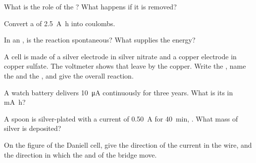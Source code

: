 \begin{exercise}[$\star$]\label{exo:g12:cells-and-electrolysis:3}
What is the role of the ? What happens if it is removed?
\end{exercise}

\begin{exercise}[$\star$]\label{exo:g12:cells-and-electrolysis:4}
Convert a  of \qty{2.5}{A.h} into coulombs.
\end{exercise}

\begin{exercise}[$\star$]\label{exo:g12:cells-and-electrolysis:5}
In an , is the reaction spontaneous? What supplies the
energy?
\end{exercise}

\begin{exercise}[$\star\star$]\label{exo:g12:cells-and-electrolysis:6}
A cell is made of a silver electrode in silver nitrate and a copper
electrode in copper sulfate. The voltmeter shows that  leave
by the copper. Write the , name the  and the ,
and give the overall reaction.
\end{exercise}

\begin{exercise}[$\star\star$]\label{exo:g12:cells-and-electrolysis:7}
A watch battery delivers \qty{10}{\micro A} continuously for three years.
What is its  in \si{mA.h}?
\end{exercise}

\begin{exercise}[$\star\star$]\label{exo:g12:cells-and-electrolysis:8}
A spoon is silver-plated with a current of \qty{0.50}{A} for
\qty{40}{min}, . What mass of silver is deposited?
\end{exercise}

\begin{exercise}[$\star\star$]\label{exo:g12:cells-and-electrolysis:9}
On the figure of the Daniell cell, give the direction of the current in
the wire, and the direction in which the  and   of
the bridge move.
\end{exercise}

